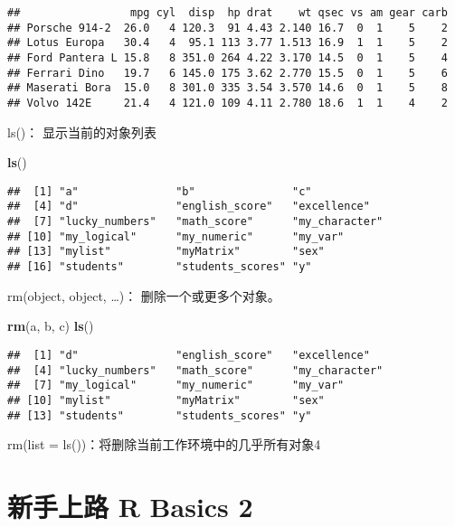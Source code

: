\documentclass[]{book}
\newenvironment{Shaded}{\begin{snugshade}}{\end{snugshade}}
\newcommand{\KeywordTok}[1]{\textcolor[rgb]{0.13,0.29,0.53}{\textbf{#1}}}
\newcommand{\NormalTok}[1]{#1}
\begin{document}
\begin{verbatim}
##                 mpg cyl  disp  hp drat    wt qsec vs am gear carb
## Porsche 914-2  26.0   4 120.3  91 4.43 2.140 16.7  0  1    5    2
## Lotus Europa   30.4   4  95.1 113 3.77 1.513 16.9  1  1    5    2
## Ford Pantera L 15.8   8 351.0 264 4.22 3.170 14.5  0  1    5    4
## Ferrari Dino   19.7   6 145.0 175 3.62 2.770 15.5  0  1    5    6
## Maserati Bora  15.0   8 301.0 335 3.54 3.570 14.6  0  1    5    8
## Volvo 142E     21.4   4 121.0 109 4.11 2.780 18.6  1  1    4    2
\end{verbatim}

ls()： 显示当前的对象列表

\begin{Shaded}
\begin{Highlighting}[]
\KeywordTok{ls}\NormalTok{()}
\end{Highlighting}
\end{Shaded}

\begin{verbatim}
##  [1] "a"               "b"               "c"              
##  [4] "d"               "english_score"   "excellence"     
##  [7] "lucky_numbers"   "math_score"      "my_character"   
## [10] "my_logical"      "my_numeric"      "my_var"         
## [13] "mylist"          "myMatrix"        "sex"            
## [16] "students"        "students_scores" "y"
\end{verbatim}

rm(object, object, \ldots{})： 删除一个或更多个对象。

\begin{Shaded}
\begin{Highlighting}[]
\KeywordTok{rm}\NormalTok{(a, b, c)}
\KeywordTok{ls}\NormalTok{()}
\end{Highlighting}
\end{Shaded}

\begin{verbatim}
##  [1] "d"               "english_score"   "excellence"     
##  [4] "lucky_numbers"   "math_score"      "my_character"   
##  [7] "my_logical"      "my_numeric"      "my_var"         
## [10] "mylist"          "myMatrix"        "sex"            
## [13] "students"        "students_scores" "y"
\end{verbatim}

rm(list = ls())：将删除当前工作环境中的几乎所有对象4

\hypertarget{-r-basics-2}{%
\chapter{新手上路 R Basics 2}\label{-r-basics-2}}
\end{document}
